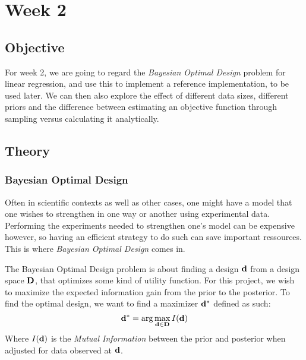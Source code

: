 \section{Week 2}
\subsection{Objective}
For week 2, we are going to regard the \textit{Bayesian Optimal Design} problem for linear regression, and use this to implement a reference implementation, to be used later.
We can then also explore the effect of different data sizes, different priors and the difference between estimating an objective function through sampling versus calculating it analytically.
\subsection{Theory}
\subsubsection{Bayesian Optimal Design}
Often in scientific contexts as well as other cases, one might have a model that one wishes to strengthen in one way or another using experimental data.
Performing the experiments needed to strengthen one's model can be expensive however, so having an efficient strategy to do such can save important ressources.
This is where \textit{Bayesian Optimal Design} comes in.

The Bayesian Optimal Design problem is about finding a design $\mathbf{d}$ from a design space $\mathbf{D}$, that optimizes some kind of utility function.\cite{ryan15} 
For this project, we wish to maximize the expected information gain from the prior to the posterior.
To find the optimal design, we want to find a maximizer $\mathbf{d}^*$ defined as such:
\begin{equation}\label{eq:bayesian-optimal}\mathbf{d}^* = \arg \max_{\mathbf{d}\in \mathbf{D}} I(\mathbf{d})\end{equation}
Where $I(\mathbf{d})$ is the \textit{Mutual Information} between the prior and posterior when adjusted for data observed at $\mathbf{d}$.\\
